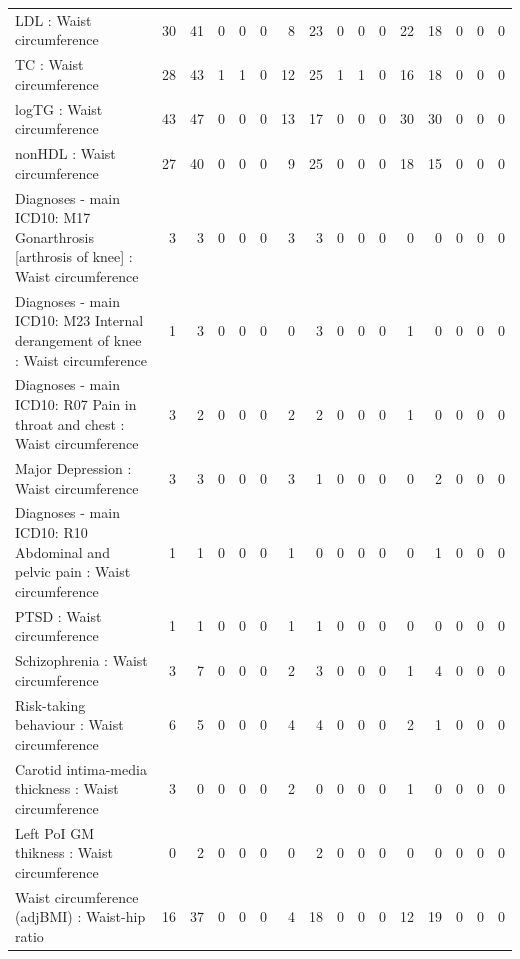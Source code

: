 \begin{table}[ht]
\begin{tabular}{lrrrrrrrrrrrrrrr}
  LDL : Waist circumference  &  30 &  41 &   0 &   0 &   0 &   8 &  23 &   0 &   0 &   0 &  22 &  18 &   0 &   0 &   0 \\ 
  TC : Waist circumference  &  28 &  43 &   1 &   1 &   0 &  12 &  25 &   1 &   1 &   0 &  16 &  18 &   0 &   0 &   0 \\ 
  logTG : Waist circumference  &  43 &  47 &   0 &   0 &   0 &  13 &  17 &   0 &   0 &   0 &  30 &  30 &   0 &   0 &   0 \\ 
  nonHDL : Waist circumference  &  27 &  40 &   0 &   0 &   0 &   9 &  25 &   0 &   0 &   0 &  18 &  15 &   0 &   0 &   0 \\ 
  Diagnoses - main ICD10: M17 Gonarthrosis [arthrosis of knee] : Waist circumference  &   3 &   3 &   0 &   0 &   0 &   3 &   3 &   0 &   0 &   0 &   0 &   0 &   0 &   0 &   0 \\ 
  Diagnoses - main ICD10: M23 Internal derangement of knee : Waist circumference  &   1 &   3 &   0 &   0 &   0 &   0 &   3 &   0 &   0 &   0 &   1 &   0 &   0 &   0 &   0 \\ 
  Diagnoses - main ICD10: R07 Pain in throat and chest : Waist circumference  &   3 &   2 &   0 &   0 &   0 &   2 &   2 &   0 &   0 &   0 &   1 &   0 &   0 &   0 &   0 \\ 
  Major Depression : Waist circumference  &   3 &   3 &   0 &   0 &   0 &   3 &   1 &   0 &   0 &   0 &   0 &   2 &   0 &   0 &   0 \\ 
  Diagnoses - main ICD10: R10 Abdominal and pelvic pain : Waist circumference  &   1 &   1 &   0 &   0 &   0 &   1 &   0 &   0 &   0 &   0 &   0 &   1 &   0 &   0 &   0 \\ 
  PTSD : Waist circumference  &   1 &   1 &   0 &   0 &   0 &   1 &   1 &   0 &   0 &   0 &   0 &   0 &   0 &   0 &   0 \\ 
  Schizophrenia : Waist circumference  &   3 &   7 &   0 &   0 &   0 &   2 &   3 &   0 &   0 &   0 &   1 &   4 &   0 &   0 &   0 \\ 
  Risk-taking behaviour : Waist circumference  &   6 &   5 &   0 &   0 &   0 &   4 &   4 &   0 &   0 &   0 &   2 &   1 &   0 &   0 &   0 \\ 
  Carotid intima-media thickness : Waist circumference  &   3 &   0 &   0 &   0 &   0 &   2 &   0 &   0 &   0 &   0 &   1 &   0 &   0 &   0 &   0 \\ 
  Left PoI GM thikness : Waist circumference  &   0 &   2 &   0 &   0 &   0 &   0 &   2 &   0 &   0 &   0 &   0 &   0 &   0 &   0 &   0 \\ 
  Waist circumference (adjBMI) : Waist-hip ratio  &  16 &  37 &   0 &   0 &   0 &   4 &  18 &   0 &   0 &   0 &  12 &  19 &   0 &   0 &   0 \\ 

\end{tabular}
\end{table}
